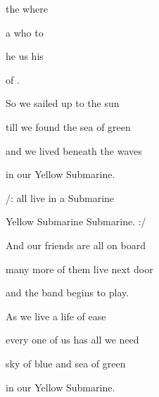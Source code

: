 

\zs
{} the  where  

 a  who  to 

 he  us  his 

  of .
\ks

\zs
So we sailed up to the sun

till we found the sea of green

and we lived beneath the waves

in our Yellow Submarine.
\ks

\zr
/:  all live in a  Submarine

Yellow Submarine  Submarine. :/
\kr

\zs
And our friends are all on board

many more of them live next door

and the band begins to play.
\ks

\zr  \kr

\zs
As we live a life of ease

every one of us has all we need

sky of blue and sea of green

in our Yellow Submarine.
\ks

\zr  \kr   \zr  \kr

\kp





